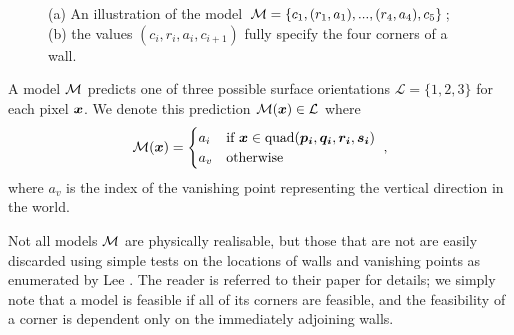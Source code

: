\begin{figure}[tb]%
  \centering
  \caption{(a) An illustration of the model
    $\mathcal{M}=\{c_1,(r_1,a_1),...,(r_4,a_4),c_5\}$; (b) the values
    $(c_i,r_i,a_i,c_{i+1})$ fully specify the four corners of a wall.}
\end{figure}

A model $\mathcal{M}$ predicts one of three possible surface orientations
$\mathcal{L}=\{1,2,3\}$ for each pixel $\boldsymbol{x}$. We denote this
prediction $\mathcal{M}(\boldsymbol{x})\in\mathcal{L}$ where
\begin{equation}
  \mathcal{M}(\boldsymbol{x}) =
  \begin{cases}
    a_i & \mbox{if } \boldsymbol{x} \in
    \mbox{quad}(\boldsymbol{p_i},\boldsymbol{q_i},\boldsymbol{r_i},\boldsymbol{s_i}) \\
    a_v & \mbox{otherwise}
  \end{cases}
  ~,
\end{equation}
where $a_v$ is the index of the vanishing point representing the
vertical direction in the world.

Not all models $\mathcal{M}$ are physically realisable, but those that are
not are easily discarded using simple tests on the locations of walls
and vanishing points as enumerated by Lee \etal \cite{Lee09}. The
reader is referred to their paper for details; we simply note that a
model is feasible if all of its corners are feasible, and the
feasibility of a corner is dependent only on the immediately adjoining
walls.


